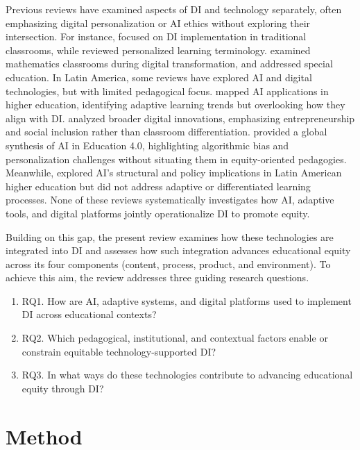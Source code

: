 \documentclass[english]{textolivre}
\begin{document}
Previous reviews have examined aspects of DI and technology separately, often emphasizing digital personalization or AI ethics without exploring their intersection. For instance, \textcite{smalejacobse2019} focused on DI implementation in traditional classrooms, while \textcite{shemshack2020} reviewed personalized learning terminology. \textcite{engelbrecht2020} examined mathematics classrooms during digital transformation, and \textcite{damyanov2024} addressed special education. In Latin America, some reviews have explored AI and digital technologies, but with limited pedagogical focus. \textcite{salaspilco2022} mapped AI applications in higher education, identifying adaptive learning trends but overlooking how they align with DI. \textcite{silvaleon2024} analyzed broader digital innovations, emphasizing entrepreneurship and social inclusion rather than classroom differentiation. \textcite{portilla2025} provided a global synthesis of AI in Education 4.0, highlighting algorithmic bias and personalization challenges without situating them in equity-oriented pedagogies. Meanwhile, \textcite{carrillo2026} explored AI’s structural and policy implications in Latin American higher education but did not address adaptive or differentiated learning processes. None of these reviews systematically investigates how AI, adaptive tools, and digital platforms jointly operationalize DI to promote equity.

Building on this gap, the present review examines how these technologies are integrated into DI and assesses how such integration advances educational equity across its four components (content, process, product, and environment). To achieve this aim, the review addresses three guiding research questions.

\begin{enumerate}
    \item RQ1. How are AI, adaptive systems, and digital platforms used to implement DI across educational contexts?
    \item RQ2. Which pedagogical, institutional, and contextual factors enable or constrain equitable technology-supported DI?
    \item RQ3. In what ways do these technologies contribute to advancing educational equity through DI?
\end{enumerate}

\section{Method}
\end{document}
